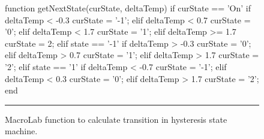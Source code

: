 \begin{figure}
  \begin{macrolab}
function getNextState(curState, deltaTemp)
  if curState == 'On'
    if deltaTemp < -0.3
      curState = '-1'; %
    elif deltaTemp < 0.7
      curState = '0'; %
    elif deltaTemp < 1.7
      curState = '1'; %
    elif deltaTemp >= 1.7
      curState = 2; %
  elif state == '-1'
    if deltaTemp > -0.3
      curState = '0';
    elif deltaTemp > 0.7
      curState = '1';
    elif deltaTemp > 1.7
      curState = '2'; 
  elif state == '1'
    if deltaTemp < -0.7
      curState = '-1';
    elif deltaTemp < 0.3
      curState = '0';
    elif deltaTemp > 1.7
      curState = '2';
end
  \end{macrolab}
  \smallskip
  \hrule width 1\columnwidth
  \caption{MacroLab function to calculate transition in hysteresis state
  machine.}
  \label{code:getNextState}
\end{figure}
